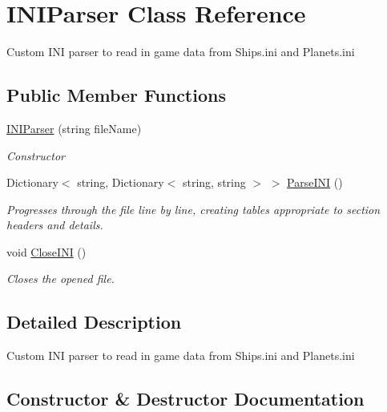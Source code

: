 \hypertarget{class_i_n_i_parser}{}\section{I\+N\+I\+Parser Class Reference}
\label{class_i_n_i_parser}


Custom I\+N\+I parser to read in game data from Ships.\+ini and Planets.\+ini  


\subsection*{Public Member Functions}
\begin{DoxyCompactItemize}
\item 
\hyperlink{class_i_n_i_parser_ab8fd5f1cf3917cd98b9b9399ec19b5dd}{I\+N\+I\+Parser} (string file\+Name)
\begin{DoxyCompactList}\small\item\em Constructor \end{DoxyCompactList}\item 
Dictionary$<$ string, Dictionary$<$ string, string $>$ $>$ \hyperlink{class_i_n_i_parser_a0ecfdeaaa35c71683eaeabc028a9beb3}{Parse\+I\+N\+I} ()
\begin{DoxyCompactList}\small\item\em Progresses through the file line by line, creating tables appropriate to section headers and details. \end{DoxyCompactList}\item 
void \hyperlink{class_i_n_i_parser_a4ebe242bfcefb5b373f77b0bc1e7f1df}{Close\+I\+N\+I} ()
\begin{DoxyCompactList}\small\item\em Closes the opened file. \end{DoxyCompactList}\end{DoxyCompactItemize}


\subsection{Detailed Description}
Custom I\+N\+I parser to read in game data from Ships.\+ini and Planets.\+ini 



\subsection{Constructor \& Destructor Documentation}
\hypertarget{class_i_n_i_parser_ab8fd5f1cf3917cd98b9b9399ec19b5dd}{}
